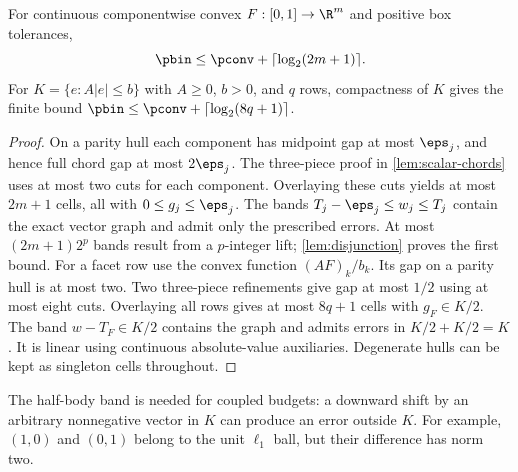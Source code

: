 \begin{proposition}\label{prop:finite-vector-overlay}
For continuous componentwise convex $F:[0,1]\to\R^m$ and positive box
tolerances,
\[
 \pbin\le\pconv+\lceil\log_2(2m+1)\rceil.
\]
For $K=\{e:A|e|\le b\}$ with $A\ge0$, $b>0$, and $q$ rows, compactness
of $K$ gives the finite bound
$\pbin\le\pconv+\lceil\log_2(8q+1)\rceil$.
\end{proposition}
\begin{proof}
On a parity hull each component has midpoint gap at most $\eps_j$,
and hence full chord
gap at most $2\eps_j$. The three-piece proof in
\cref{lem:scalar-chords} uses at most two cuts for each component.
Overlaying these cuts yields at most $2m+1$ cells, all with
$0\le g_j\le\eps_j$. The bands
$T_j-\eps_j\le w_j\le T_j$ contain the exact vector graph and admit
only the prescribed errors. At most $(2m+1)2^p$ bands result from a
$p$-integer lift; \cref{lem:disjunction} proves the first bound.
For a facet row use the convex function $(AF)_k/b_k$. Its gap on a
parity hull is at most two. Two three-piece refinements give gap at
most $1/2$ using at most eight cuts. Overlaying all rows gives at most
$8q+1$ cells with $g_F\in K/2$. The band $w-T_F\in K/2$ contains
the graph and admits errors in $K/2+K/2=K$. It is linear using
continuous absolute-value auxiliaries. Degenerate hulls can be kept
as singleton cells throughout.
\end{proof}

The half-body band is needed for coupled budgets: a downward shift by an
arbitrary nonnegative vector in $K$ can produce an error outside $K$.
For example, $(1,0)$ and $(0,1)$ belong to the unit $\ell_1$ ball, but
their difference has norm two.

